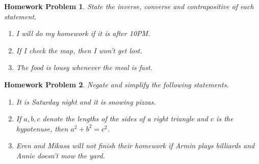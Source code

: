 \documentclass{article}
\newtheorem{hw}{Homework Problem}
\begin{document}
	\begin{hw}
		State the inverse, converse and contrapositive of each statement.
		\begin{enumerate}
			\item I will do my homework if it is after 10PM.
			\item If I check the map, then I won't get lost.
			\item The food is lousy whenever the meal is fast.
		\end{enumerate}
	\end{hw}
	\begin{hw}
		Negate and simplify the following statements.
		\begin{enumerate}
			\item It is Saturday night and it is snowing pizzas.
			\item If $a, b, c$ denote the lengths of the sides of a right triangle and $c$ is the hypotenuse, then $a^2+b^2 =c^2$.
			\item Eren and Mikasa will not finish their homework if Armin plays billiards and Annie doesn't mow the yard.
		\end{enumerate}
	\end{hw}

	\underline{\hspace{5in}}
\end{document}
